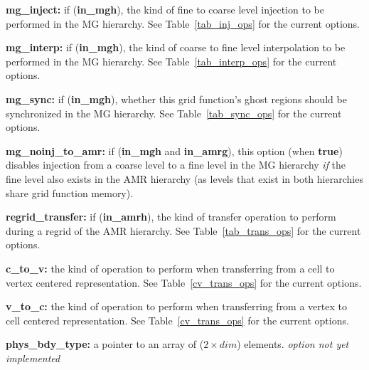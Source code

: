\documentclass[aps,amssymb,unsortedaddress,nofootinbib]{revtex4}
\def\lsep{\itemsep 0.05in}
\begin{document}
\begin{list}{}{\lsep}
\item {\bf mg\_inject:} if ({\bf in\_mgh}), the kind of fine to coarse level injection to be performed in the MG
          hierarchy. See Table~\ref{tab_inj_ops} for the current options. 

\item {\bf mg\_interp:} if ({\bf in\_mgh}), the kind of coarse to fine level interpolation to be performed
          in the MG hierarchy.
          See Table~\ref{tab_interp_ops} for the current options. 

\item {\bf mg\_sync:} if ({\bf in\_mgh}), whether this grid function's ghost regions should be 
          synchronized in the MG hierarchy.
          See Table~\ref{tab_sync_ops} for the current options. 

\item {\bf mg\_noinj\_to\_amr:} if ({\bf in\_mgh} and {\bf in\_amrg}), this option (when {\bf true})
          disables injection from a coarse level to a fine level in the MG hierarchy {\em if} the fine
          level also exists in the AMR hierarchy (as levels that exist in both hierarchies
          share grid function memory). 

\item {\bf regrid\_transfer:} if ({\bf in\_amrh}), the kind of transfer operation to perform during
          a regrid of the AMR hierarchy.
          See Table~\ref{tab_trans_ops} for the current options. 

\item {\bf c\_to\_v:} the kind of operation to perform when transferring from a cell to vertex centered
          representation. See Table~\ref{cv_trans_ops} for the current options. 

\item {\bf v\_to\_c:} the kind of operation to perform when transferring from a vertex to cell centered
          representation. See Table~\ref{cv_trans_ops} for the current options. 

\item {\bf phys\_bdy\_type:} a pointer to an array of ($2\times dim$) elements. {\em option not yet implemented}

\end{list}
\end{document}
